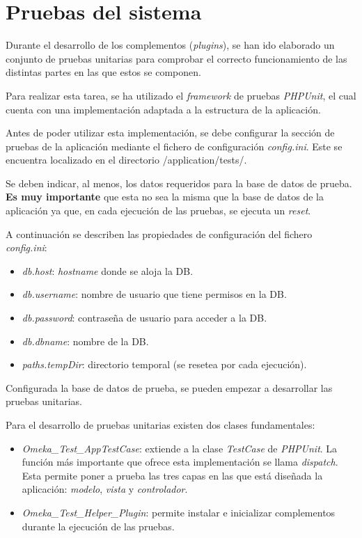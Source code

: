 \section{Pruebas del sistema}

Durante el desarrollo de los complementos (\emph{plugins}), se han ido
elaborado un conjunto de pruebas unitarias para comprobar el correcto
funcionamiento de las distintas partes en las que estos se componen.

Para realizar esta tarea, se ha utilizado el \emph{framework} de pruebas
\emph{PHPUnit}, el cual cuenta con una implementación adaptada a la
estructura de la aplicación.

Antes de poder utilizar esta implementación, se debe configurar la
sección de pruebas de la aplicación mediante el fichero de configuración
\emph{config.ini}. Este se encuentra localizado en el directorio
{/application/tests/}.

Se deben indicar, al menos, los datos requeridos para la base de datos
de prueba. \textbf{Es muy importante} que esta no sea la misma que la
base de datos de la aplicación ya que, en cada ejecución de las pruebas,
se ejecuta un \emph{reset}.

A continuación se describen las propiedades de configuración del fichero
\emph{config.ini}:

\begin{itemize}
\tightlist
\item
  \emph{db.host}: \emph{hostname} donde se aloja la DB.
\item
  \emph{db.username}: nombre de usuario que tiene permisos en la DB.
\item
  \emph{db.password}: contraseña de usuario para acceder a la DB.
\item
  \emph{db.dbname}: nombre de la DB.
\item
  \emph{paths.tempDir}: directorio temporal (se resetea por cada
  ejecución).
\end{itemize}

Configurada la base de datos de prueba, se pueden empezar a desarrollar
las pruebas unitarias.

Para el desarrollo de pruebas unitarias existen dos clases
fundamentales:

\begin{itemize}
\tightlist
\item
  \emph{Omeka\_Test\_AppTestCase}: extiende a la clase \emph{TestCase}
  de \emph{PHPUnit}. La función más importante que ofrece esta
  implementación se llama \emph{dispatch}. Esta permite poner a prueba
  las tres capas en las que está diseñada la aplicación: \emph{modelo},
  \emph{vista} y \emph{controlador}.
\item
  \emph{Omeka\_Test\_Helper\_Plugin}: permite instalar e inicializar
  complementos durante la ejecución de las pruebas.
\end{itemize}

